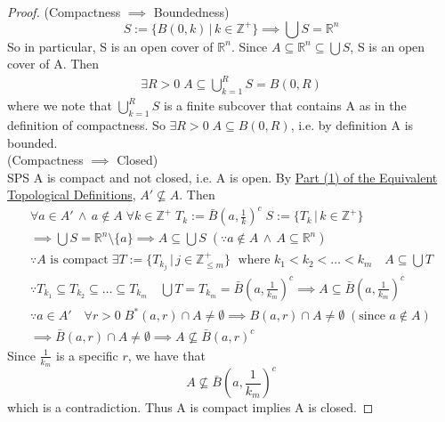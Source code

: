 \documentclass[11pt, oneside]{book}
\theoremstyle{break}
\newtheorem*{proof}{Proof}
\newcommand{\bb}[1]{\mathbb{#1}}			%
\begin{document}
\begin{proof}
	(Compactness $\implies$ Boundedness) \\
	\begin{equation*}
		S := \{B(0, k) \, | \, k \in \bb{Z}^+\} \implies \bigcup S = \bb{R}^n
	\end{equation*}
	So in particular, S is an open cover of $\bb{R}^n$. Since $A \subseteq \bb{R}^n \subseteq \bigcup S$, S is an open cover of A. Then
	\begin{gather*}
		\exists R > 0 \; A \subseteq \bigcup_{k=1}^R S = B(0, R)
	\end{gather*}
	where we note that $\bigcup_{k=1}^R S$ is a finite subcover that contains A as in the definition of compactness. So $\exists R > 0 \; A \subseteq B(0, R)$, i.e. by definition A is bounded. \\

	(Compactness $\implies$ Closed) \\
	SPS A is compact and not closed, i.e. A is open. By \hyperref[ETD]{Part (1) of the Equivalent Topological Definitions}, $A' \nsubseteq A$. Then
	\begin{gather*}
		\forall a \in A' \, \land \, a \notin A \; \forall k \in \bb{Z}^+ \; T_k := \bar{B} \left(a, \frac{1}{k} \right)^c \; S := \{T_k \, | \, k \in \bb{Z}^+\} \\
		\implies \bigcup S = \bb{R}^n \setminus \{a\} \implies A \subseteq \bigcup S \; (\because a \notin A \, \land \, A \subseteq \bb{R}^n) \\
		\because A \text{ is compact} \; \exists T := \{T_{k_j} \, | \, j \in \bb{Z}_{\leq m}^+ \} \; \text{ where } k_1 < k_2 < \hdots < k_m \quad A \subseteq \bigcup T \\
		\because T_{k_1} \subseteq T_{k_2} \subseteq \hdots \subseteq T_{k_m} \quad \bigcup T = T_{k_m} = \bar{B} \left(a, \frac{1}{k_m} \right)^c \implies A \subseteq \bar{B} \left(a, \frac{1}{k_m} \right)^c \\
		\because a \in A' \quad \forall r > 0 \; B^*(a, r) \cap A \neq \emptyset \implies B(a,r) \cap A \neq \emptyset \; (\text{since } a \notin A) \\
		\implies \bar{B} \left(a, r \right) \cap A \neq \emptyset \implies A \nsubseteq \bar{B}(a, r)^c
	\end{gather*}
	Since $\frac{1}{k_m}$ is a specific $r$, we have that
	\begin{equation*}
		A \nsubseteq \bar{B} \left(a, \frac{1}{k_m} \right)^c
	\end{equation*}
	which is a contradiction. Thus A is compact implies A is closed.


\end{proof}
\end{document}
